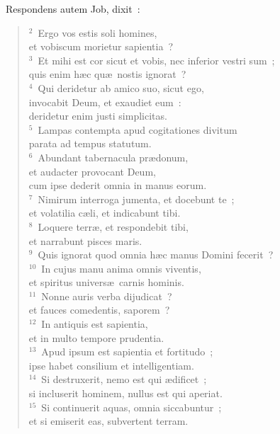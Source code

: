 ~\lettrine[lines=10,image=true,loversize=0.05,lraise=-0.03]{R}{}espondens autem Job, dixit~:
\begin{flushleft}\begin{verse}\vspace{6pt}${}^{2}$~Ergo vos estis soli homines,\\ et vobiscum morietur sapientia~?\\
${}^{3}$~Et mihi est cor sicut et vobis, nec inferior vestri sum~;\\ quis enim h\ae c qu\ae\ nostis ignorat~?\\
${}^{4}$~Qui deridetur ab amico suo, sicut ego,\\ invocabit Deum, et exaudiet eum~:\\ deridetur enim justi simplicitas.\\
${}^{5}$~Lampas contempta apud cogitationes divitum\\ parata ad tempus statutum.\\
${}^{6}$~Abundant tabernacula pr\ae donum,\\ et audacter provocant Deum,\\ cum ipse dederit omnia in manus eorum.\\
${}^{7}$~Nimirum interroga jumenta, et docebunt te~;\\ et volatilia c\ae li, et indicabunt tibi.\\
${}^{8}$~Loquere terr\ae , et respondebit tibi,\\ et narrabunt pisces maris.\\
${}^{9}$~Quis ignorat quod omnia h\ae c manus Domini fecerit~?\\
${}^{10}$~In cujus manu anima omnis viventis,\\ et spiritus univers\ae\ carnis hominis.\\
${}^{11}$~Nonne auris verba dijudicat~?\\ et fauces comedentis, saporem~?\\
${}^{12}$~In antiquis est sapientia,\\ et in multo tempore prudentia.\\
${}^{13}$~Apud ipsum est sapientia et fortitudo~;\\ ipse habet consilium et intelligentiam.\\
${}^{14}$~Si destruxerit, nemo est qui \ae dificet~;\\ si incluserit hominem, nullus est qui aperiat.\\
${}^{15}$~Si continuerit aquas, omnia siccabuntur~;\\ et si emiserit eas, subvertent terram.\\

\end{verse}
\end{flushleft}
